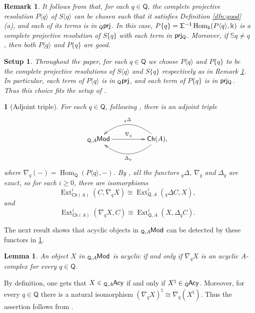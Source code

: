 \documentclass{amsart}
\theoremstyle{bfupright head,slanted body}
\theoremstyle{bfupright head,upright body}
\newtheorem{bfhpg}[res]{}               \newtheorem*{bfhpg*}{}
\theoremstyle{fixed bf head,slanted body}
\newtheorem{lem}[res]{Lemma}            \newtheorem*{lem*}{Lemma}
\theoremstyle{fixed bf head,upright body}
\newtheorem{rmk}[res]{Remark}           \newtheorem*{rmk*}{Remark}
\newtheorem{setup}[res]{Setup}           \newtheorem*{setup*}{Setup}
\theoremstyle{numbered paragraph}
\newenvironment{prf*}[1][Proof]{%
	\begin{proof}[\bf #1]
		\setcounter{equation}{0}
		\renewcommand{\theequation}{\arabic{equation}}}
	{\end{proof}
}
\numberwithin{equation}{res}
\newcommand{\ch}[1]{\mathsf{Ch}(#1)}
\newcommand{\Hom}{\operatorname{Hom}}
\newcommand{\Ext}[4][]{\operatorname{Ext}_{#1}^{#2}(#3,#4)}
\newcommand{\Q}{\mathsf{Q}}
\newcommand{\kk}{\Bbbk}
\newcommand{\lMod}[1]{{}_{#1}\mspace{-1mu}{\sf{Mod}}}
\newcommand{\lE}[1]{{}_{#1}\mspace{-1mu}{\sf{Acy}}}
\newcommand{\nablaq}{\nabla_q}
\newcommand{\DeltaLq}{{}_q\Delta}
\newcommand{\DeltaRq}{\Delta_q}
\begin{document}
\begin{rmk}\label{rmk:standard}
It follows from \cite[Lemmas 2.7 and 2.9]{HJ26} that, for each $q\in\Q$, the complete projective resolution $P\langle q\rangle$ of $S\langle q\rangle$ can be chosen such that it satisfies Definition \ref{dfn:good}(a), and each of its terms is in ${}_\Q\sf prj$. In this case, $P\{q\}={\sf{\Sigma}^{-1}}\Hom_\kk(P\langle q\rangle,\kk)$ is a complete projective resolution of $S\{q\}$ with each term in $\sf prj_\Q$. Moreover, if $\mathbb{S}q\neq q$, then both $P\langle q\rangle$ and $P\{q\}$ are good.
\end{rmk}

\begin{setup}\label{setup:choosen}
Throughout the paper, for each $q\in\Q$ we choose $P\langle q\rangle$ and $P\{q\}$ to be the complete projective resolutions of $S\langle q\rangle$ and $S\{q\}$ respectively as in Remark \ref{rmk:standard}. In particular, each term of $P\langle q\rangle$ is in ${}_\Q\sf prj$, and each term of $P\{q\}$ is in $\sf prj_\Q$. Thus this choice fits the setup of \cite[Setup 3.1]{HJ26}.
\end{setup}

\begin{bfhpg}[Adjoint triple]\label{adjoint-pair}
For each $q\in\Q$, following \cite{HJ26}, there is an adjoint triple
  \begin{equation*}
  \xymatrix@C=4pc{
    \lMod{\Q,A}
    \ar[r]^-{\nablaq}
    &
    \ch A,
    \ar@/_1.8pc/[l]_-{\DeltaLq}
    \ar@/^1.8pc/[l]^-{\DeltaRq}
  }
  \end{equation*}
where $\nablaq(-)=\Hom_{\Q}(P\langle q\rangle,-)$. By \cite[Lemmas 3.5$(i)$ and 4.5]{HJ26}, all the functors $\DeltaLq$, $\nablaq$ and $\DeltaRq$ are exact, so for each $i\geq0$, there are isomorphisms
\begin{equation*}
\Ext[\ch A]{i}{C}{\nablaq X}\cong\Ext[\Q,A]{i}{\DeltaLq C}{X},
\end{equation*}
and
\begin{equation*}
\Ext[\ch A]{i}{\nablaq X}{C}\cong\Ext[\Q,A]{i}{X}{\DeltaRq C}.
\end{equation*}
\end{bfhpg}

The next result shows that acyclic objects in $\lMod{\Q,A}$ can be detected by these functors in \ref{adjoint-pair}.

\begin{lem}\label{lem:exact}
An object $X$ in $\lMod{\Q,A}$ is acyclic if and only if $\nabla_qX$ is an acyclic $A$-complex for every $q\in\Q$.
\end{lem}
\begin{prf*}
By definition, one gets that $X\in\lE{\Q,A}$ if and only if $X^\natural\in\lE{\Q}$. Moreover, for every $q\in\Q$ there is a natural isomorphism $(\nabla_qX)^\natural\cong\nabla_q(X^\natural)$. Thus the assertion follows from \cite[Lemma 3.12]{HJ26}.
\end{prf*}
\end{document}
